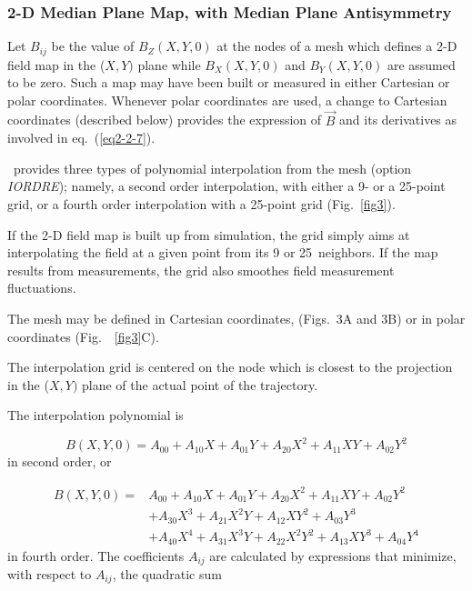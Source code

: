   
\subsubsection{2-D Median Plane Map, with Median Plane Antisymmetry} \label{sec2.4.2}

Let $ B_{ij} $ be the value of $ B_Z(X,Y,0) $ at the nodes of a mesh
which defines a 2-D field map in the ($ X,Y) $ plane while $ B_X(X,Y,0) $ and $ B_Y(X,Y,0) $
are assumed to be zero.  Such a map may have been built or measured 
in either Cartesian or polar coordinates.  Whenever polar coordinates are used, a
change to Cartesian coordinates (described below) provides the expression of 
$ \vec  B $ and its derivatives as involved in eq.~(\ref{eq2-2-7}). 

\noindent\zgou\ provides three types of polynomial
interpolation from the mesh (option \textsl{IORDRE}); namely, a second order interpolation, 
with either a 9- or a 25-point grid, or a fourth 
order interpolation with a 25-point  grid (Fig.~\ref{fig3}).  

\noindent If the 2-D field map is built up from  simulation, the grid simply
aims at interpolating the field at a given point from its 9 or 25~neighbors.  If 
the map results from measurements, the grid also smoothes field measurement 
fluctuations. 

\noindent The mesh may be defined in Cartesian coordinates, 
(Figs.~3A and 3B) or in polar coordinates (Fig.~~\ref{fig3}C).   

\noindent The interpolation grid is centered on the node which is closest to
the projection in  the ($ X,Y) $ plane of the actual point of the trajectory. 

\noindent The interpolation polynomial is 

 \begin{equation}
	 B(X,Y,0) = A_{00} + A_{10}X + A_{01}Y + A_{20}X^2 + A_{11}XY + A_{02}Y^2
 	\label{eq2-4-4}
 \end{equation}
 in second order, or 

 \begin{equation}
	 \begin{aligned}
		 B(X,Y,0)  = 
		    & A_{00}+A_{10}X+A_{01}Y + A_{20}X^2 + A_{11}XY + A_{02}Y^2 \\
		    & +  A_{30}X^3+A_{21}X^2Y + A_{12}XY^2 + A_{03}Y^3 \\
		    & +  A_{40}X^4 + A_{31}X^3Y + A_{22}X^2Y^2 +A_{13}XY^3 + A_{04}Y^4 
	 \end{aligned}
 	\label{eq2-4-5}
 \end{equation}
%
in fourth order.  The coefficients $ A_{ij} $ are calculated by
expressions that 
minimize, with respect to $ A_{ij}$, the quadratic sum 

